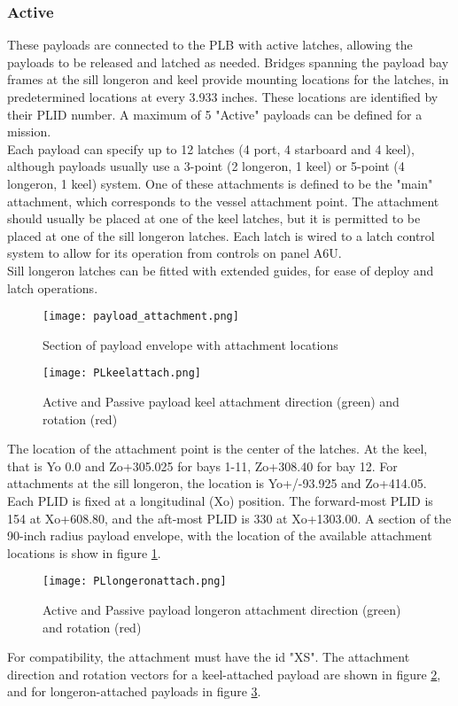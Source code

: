 \documentclass[Space_Shuttle_Vessel_Manual.tex]{subfiles}
\begin{document}
\begin{multicols*}{2}
\subsubsection{Active}
\label{sec:activepl}
These payloads are connected to the PLB with active latches, allowing the payloads to be released and latched as needed. Bridges spanning the payload bay frames at the sill longeron and keel provide mounting locations for the latches, in predetermined locations at every 3.933 inches. These locations are identified by their PLID number.
A maximum of 5 "Active" payloads can be defined for a mission.
\\
Each payload can specify up to 12 latches (4 port, 4 starboard and 4 keel), although payloads usually use a 3-point (2 longeron, 1 keel) or 5-point (4 longeron, 1 keel) system.
One of these attachments is defined to be the "main" attachment, which corresponds to the vessel attachment point. The attachment should usually be placed at one of the keel latches, but it is permitted to be placed at one of the sill longeron latches. Each latch is wired to a latch control system to allow for its operation from controls on panel A6U.
\\
Sill longeron latches can be fitted with extended guides, for ease of deploy and latch operations.
\\
\begin{figure}[H]
  \centering
  \captionsetup{justification=centering}
  \texttt{[image: payload\_attachment.png]}
  \caption{Section of payload envelope with attachment locations}
  \label{fig:payload_attachment}
\end{figure}
\begin{figure}[H]
  \centering
  \captionsetup{justification=centering}
  \texttt{[image: PLkeelattach.png]}
  \caption{Active and Passive payload keel attachment direction (green) and rotation (red)}
  \label{fig:PLkeelattach}
\end{figure}

The location of the attachment point is the center of the latches. At the keel, that is Yo 0.0 and Zo+305.025 for bays 1-11, Zo+308.40 for bay 12. For attachments at the sill longeron, the location is Yo+/-93.925 and Zo+414.05. Each PLID is fixed at a longitudinal (Xo) position. The forward-most PLID is 154 at Xo+608.80, and the aft-most PLID is 330 at Xo+1303.00. A section of the 90-inch radius payload envelope, with the location of the available attachment locations is show in figure \ref{fig:payload_attachment}.
\\
\begin{figure}[H]
  \centering
  \captionsetup{justification=centering}
  \texttt{[image: PLlongeronattach.png]}
  \caption{Active and Passive payload longeron attachment direction (green) and rotation (red)}
  \label{fig:PLlongeronattach}
\end{figure}
For compatibility, the attachment must have the id "XS". The attachment direction and rotation vectors for a keel-attached payload are shown in figure \ref{fig:PLkeelattach}, and for longeron-attached payloads in figure \ref{fig:PLlongeronattach}.



\end{multicols*}
\end{document}
